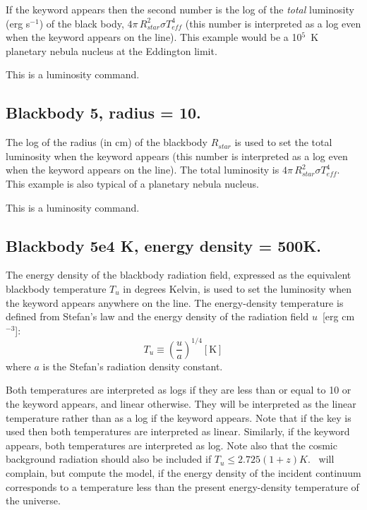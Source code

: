 If the keyword  appears then the second number
is the log of
the \emph{total} luminosity (erg s$^{-1}$) of the black body, $4\pi \,R_{star}^2 \sigma T_{eff}^4 $
(this number is interpreted as a log even when the keyword  appears on the line).
This example would be a 10$^5$~K planetary nebula nucleus at the Eddington
limit.

This is a luminosity command.

\subsection{Blackbody 5, radius = 10.  }

The log of the radius (in cm) of the blackbody $R_{star}$
is used to set the
total luminosity when the keyword  appears
(this number is interpreted as a log even when the keyword  appears on the line).
The total luminosity
is $4\pi \,R_{star}^2 \sigma T_{eff}^4 $.
This example is also typical of a planetary nebula nucleus.

This is a luminosity command.

\subsection{Blackbody 5e4 K, energy density = 500K.  }

The energy density of the blackbody radiation field, expressed as the
equivalent blackbody temperature $T_u$ in degrees Kelvin,
is used to set the
luminosity when the  keyword appears
anywhere on the line.
The energy-density temperature is defined from Stefan's law and the energy
density of the radiation field $u$~[erg cm$^{-3}$]:
\begin{equation}
T_u  \equiv \left( {\frac{u}{a}} \right)^{1/4}  [\mathrm{K}]%
\end{equation}
where $a$ is the Stefan's radiation density constant.

Both temperatures are interpreted as logs if they are less than or equal
to 10 or the keyword  appears, and linear otherwise.  They will be interpreted as the linear
temperature rather than as a log if the keyword  appears.  Note that
if the  key is used then both temperatures are interpreted as linear.
Similarly, if the keyword  appears, both temperatures are interpreted as log.
Note also that the cosmic background radiation should also be included if
$T_u\le 2.725 (1+z) K$.
\Cloudy\ will complain, but compute the model, if the
energy density of the incident continuum corresponds to a temperature less
than the present energy-density temperature of the universe.

